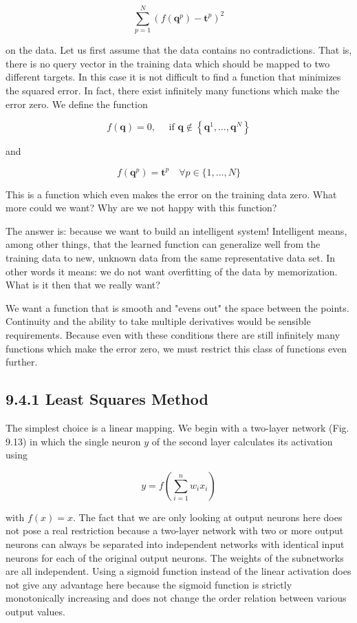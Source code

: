 \documentclass[10pt]{book}
\begin{document}
\begin{center}
\begin{enumerate}
\begin{center}
\begin{center}
\begin{center}
$$
\sum_{p=1}^{N}\left(f\left(\boldsymbol{q}^{p}\right)-\boldsymbol{t}^{p}\right)^{2}
$$

on the data. Let us first assume that the data contains no contradictions. That is, there is no query vector in the training data which should be mapped to two different targets. In this case it is not difficult to find a function that minimizes the squared error. In fact, there exist infinitely many functions which make the error zero. We define the function

$$
f(\boldsymbol{q})=0, \quad \text { if } \boldsymbol{q} \notin\left\{\boldsymbol{q}^{1}, \ldots, \boldsymbol{q}^{N}\right\}
$$

and

$$
f\left(\boldsymbol{q}^{p}\right)=\boldsymbol{t}^{p} \quad \forall p \in\{1, \ldots, N\}
$$

This is a function which even makes the error on the training data zero. What more could we want? Why are we not happy with this function?

The answer is: because we want to build an intelligent system! Intelligent means, among other things, that the learned function can generalize well from the training data to new, unknown data from the same representative data set. In other words it means: we do not want overfitting of the data by memorization. What is it then that we really want?

We want a function that is smooth and "evens out" the space between the points. Continuity and the ability to take multiple derivatives would be sensible requirements. Because even with these conditions there are still infinitely many functions which make the error zero, we must restrict this class of functions even further.

\subsection*{9.4.1 Least Squares Method}
The simplest choice is a linear mapping. We begin with a two-layer network (Fig. 9.13) in which the single neuron $y$ of the second layer calculates its activation using


$$
y=f\left(\sum_{i=1}^{n} w_{i} x_{i}\right)
$$

with $f(x)=x$. The fact that we are only looking at output neurons here does not pose a real restriction because a two-layer network with two or more output neurons can always be separated into independent networks with identical input neurons for each of the original output neurons. The weights of the subnetworks are all independent. Using a sigmoid function instead of the linear activation does not give any advantage here because the sigmoid function is strictly monotonically increasing and does not change the order relation between various output values.


\end{center}
\end{center}
\end{center}
\end{enumerate}
\end{center}
\end{document}
